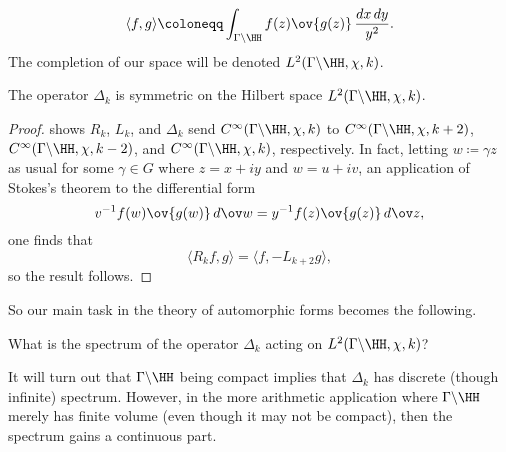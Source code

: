 \documentclass{article}
\begin{document}
\[\langle f,g\rangle\coloneqq\int_{\Gamma\backslash\HH}f(z)\ov{g(z)}\,\frac{dx\,dy}{y^2}.\]
The completion of our space will be denoted $L^2(\Gamma\backslash\HH,\chi,k)$.
\begin{lemma}
	The operator $\Delta_k$ is symmetric on the Hilbert space $L^2(\Gamma\backslash\HH,\chi,k)$.
\end{lemma}
\begin{proof}
	 shows $R_k$, $L_k$, and $\Delta_k$ send $C^\infty(\Gamma\backslash\HH,\chi,k)$ to $C^\infty(\Gamma\backslash\HH,\chi,k+2)$, $C^\infty(\Gamma\backslash\HH,\chi,k-2)$, and $C^\infty(\Gamma\backslash\HH,\chi,k)$, respectively. In fact, letting $w\coloneqq\gamma z$ as usual for some $\gamma\in G$ where $z=x+iy$ and $w=u+iv$, an application of Stokes's theorem to the differential form
	\[v^{-1}f(w)\ov{g(w)}\,d\ov w=y^{-1}f(z)\ov{g(z)}\,d\ov z,\]
	one finds that
	\[\langle R_kf,g\rangle=\langle f,-L_{k+2}g\rangle,\]
	so the result follows.
\end{proof}
So our main task in the theory of automorphic forms becomes the following.
\begin{ques} \label{ques:spectral-laplacian}
	What is the spectrum of the operator $\Delta_k$ acting on $L^2(\Gamma\backslash\HH,\chi,k)$?
\end{ques}
It will turn out that $\Gamma\backslash\HH$ being compact implies that $\Delta_k$ has discrete (though infinite) spectrum. However, in the more arithmetic application where $\Gamma\backslash\HH$ merely has finite volume (even though it may not be compact), then the spectrum gains a continuous part.
\end{document}
